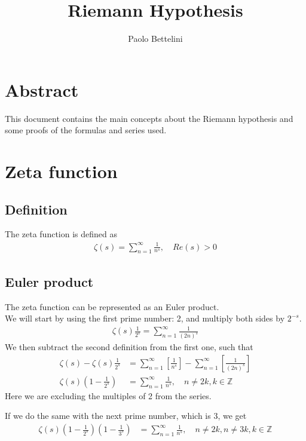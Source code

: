 \documentclass{article}
\title{Riemann Hypothesis}
\author{Paolo Bettelini}
\date{}
\begin{document}
\maketitle

\section*{Abstract}
This document contains the main concepts about the
Riemann hypothesis and some proofs of the formulas and series used.

\pagebreak

\tableofcontents
\pagebreak

\section{Zeta function}

\subsection{Definition}
The zeta function is defined as
\begin{align*}
    \zeta(s)=\sum_{n=1}^{\infty}\frac{1}{n^s},\quad Re(s)>0
\end{align*}

\subsection{Euler product}
The zeta function can be represented as an Euler product.
\\
We will start by using the first prime number: 2, and multiply both sides by $2^{-s}$.
\begin{align*}
    \zeta(s)\frac{1}{2^s}=\sum_{n=1}^{\infty}\frac{1}{(2n)^s}
\end{align*}
We then subtract the second definition from the first one, such that
\begin{align*}
    \zeta(s)-\zeta(s)\frac{1}{2^s}&=
    \sum_{n=1}^{\infty}\left[\frac{1}{n^s}\right]-
    \sum_{n=1}^{\infty}\left[\frac{1}{(2n)^s}\right]
    \\
    \zeta(s)\left(1-\frac{1}{2^s}\right)&=
    \sum_{n=1}^{\infty}\frac{1}{n^s},
    \quad n\neq 2k,k\in \mathds{Z}
\end{align*}
Here we are excluding the multiples of 2 from the series.

If we do the same with the next prime number, which is 3, we get
\begin{align*}
    \zeta(s)\left(1-\frac{1}{2^s}\right)\left(1-\frac{1}{3^s}\right)&=
    \sum_{n=1}^{\infty}\frac{1}{n^s},
    \quad n\neq 2k,n\neq 3k, k\in \mathds{Z}
\end{align*}
\end{document}
